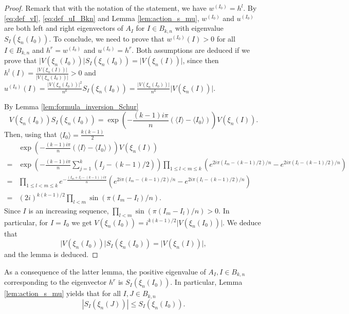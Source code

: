 \documentclass[10pt,11pt]{amsart}%
\begin{document}
\begin{proof}
Remark that with the notation of the statement, we have $w^{(I_0)}=h^l$. By \eqref{eq:def_vI}, \eqref{eq:def_uI_Bkn} and Lemma \ref{lem:action_s_mu}, $w^{(I_0)}$ and $u^{(I_0)}$ are both left and right eigenvectors of $A_{I}$ for $I\in B_{k,n}$ with eigenvalue $S_{I}(\xi_{n}(I_0))$. To conclude, we need to prove that $w^{(I_0)}(I)>0$ for all $I\in B_{k,n}$ and $h^r=w^{(I_0)}$  and $u^{(I_0)}=h^r$. Both assumptions are deduced if we prove that $\vert V(\xi_n(I_0))\vert S_I(\xi_{n}(I_0))=\vert V(\xi_{n}(I))\vert$, since then $h^l(I)=\frac{\vert V(\xi_{n}(I))\vert}{\vert V(\xi_n(I_0))\vert}>0$ and $u^{(I_0)}(I)=\frac{\vert V(\xi_n(I_0))\vert^2}{n^k}S_{I}(\xi_{n}(I_0))=\frac{\vert V(\xi_n(I_0))\vert}{n^k}\vert V(\xi_{n}(I))\vert$. 

By Lemma \ref{lem:formula_inversion_Schur}
$$V(\xi_{n}(I_0))S_{I}(\xi_{n}(I_0))=\exp\left(-\frac{(k-1)i\pi}{n}(\langle I\rangle-\langle I_0\rangle)\right)V(\xi_{n}(I)).$$
Then, using that $\langle I_0\rangle=\frac{k(k-1)}{2}$
\begin{align*}
&\exp\left(-\frac{(k-1)i\pi}{n}(\langle I\rangle-\langle I_0\rangle)\right)V(\xi_{n}(I))\\
=&\exp\left(-\frac{(k-1)i\pi}{n}\sum_{j=1}^k(I_j-(k-1)/2)\right)\prod_{1\leq l<m\leq k}\left( e^{2i\pi (I_m-(k-1)/2)/n}-e^{2i\pi (I_l-(k-1)/2)/n}\right)\\
=&\prod_{1\leq l<m\leq k}e^{-\frac{(I_m+I_l-(k-1))i\pi}{n}}\left(e^{2i\pi (I_m-(k-1)/2)/n}-e^{2i\pi (I_l-(k-1)/2)/n}\right)\\
=&(2i)^{k(k-1)/2}\prod_{l<m}\sin(\pi(I_m-I_l)/n).
\end{align*}
Since $I$ is an increasing sequence, $\prod_{l<m}\sin(\pi(I_m-I_l)/n)>0$. In particular, for $I=I_0$ we get
$V(\xi_{n}(I_0))=i^{k(k-1)/2}\vert V(\xi_{n}(I_0))\vert$. We deduce that 
\begin{equation}\label{eq:rel_S_V}
\vert V(\xi_n(I_0))\vert S_I(\xi_{n}(I_0))=\vert V(\xi_{n}(I))\vert,
\end{equation}
and the lemma is deduced.
\end{proof}
As a consequence of the latter lemma, the positive eigenvalue of $A_I, I\in B_{k,n}$ corresponding to the eigenvector $h^r$ is $S_{I}(\xi_n(I_0))$. In particular, Lemma \ref{lem:action_s_mu} yields that for all $I,J\in B_{k,n}$
\begin{equation}\label{eq:inequality_Perron_Frobenius}
\left\vert S_{I}(\xi_n(J))\right\vert\leq S_{I}(\xi_n(I_0)).
\end{equation}
\end{document}
